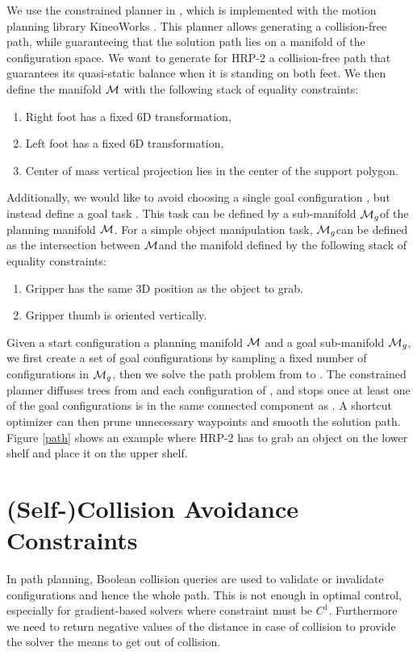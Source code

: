 We use the constrained planner in \cite{dali09}, which is
implemented with the motion planning library KineoWorks\texttrademark
\cite{Laumond2006}. This planner allows generating a collision-free
path, while guaranteeing that the solution path lies on a manifold of
the configuration space. We want to generate for HRP-2 a
collision-free path that guarantees its quasi-static balance when it
is standing on both feet. We then define the manifold $\mathcal{M}$
with the following stack of equality constraints:

\begin{enumerate}
  \item Right foot has a fixed 6D transformation,
  \item Left foot has a fixed 6D transformation,
  \item Center of mass vertical projection lies in the center of the
    support polygon.
\end{enumerate}

Additionally, we would like to avoid choosing a single goal
configuration , but instead define a goal task
. This task can be defined by a sub-manifold
$\mathcal{M}_{g}$\thinspace of the planning manifold $\mathcal{M}$. For a
simple object manipulation task, $\mathcal{M}_{g}$\thinspace can be
defined as the intersection between $\mathcal{M}$\thinspace and the
manifold defined by the following stack of equality constraints:

\begin{enumerate}
  \item Gripper has the same 3D position as the object to grab.
  \item Gripper thumb is oriented vertically.
\end{enumerate}

Given a start configuration  a planning manifold $\mathcal{M}$
and a goal sub-manifold $\mathcal{M}_{g}$, we first create a set of goal
configurations  by sampling a fixed number of configurations
in $\mathcal{M}_{g}$, then we solve the path problem from  to
. The constrained planner diffuses trees from  and
each configuration of , and stops once at least one of the
goal configurations is in the same connected component as
. A shortcut optimizer can then prune unnecessary waypoints
and smooth the solution path. Figure \ref{path} shows an example where
HRP-2 has to grab an object on the lower shelf and place it on the
upper shelf.

\section{(Self-)Collision Avoidance Constraints}
\label{distance-constraints}
In path planning, Boolean collision queries are used to validate or
invalidate configurations and hence the whole path. This is not enough
in optimal control, especially for gradient-based solvers where
constraint must be $C^1$. Furthermore we need to return negative
values of the distance in case of collision to provide the solver the
means to get out of collision.

